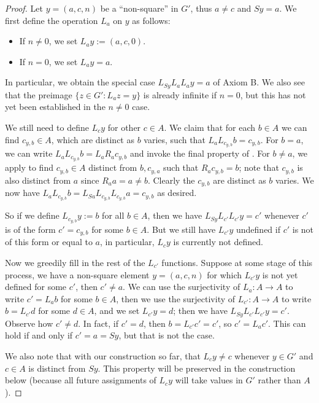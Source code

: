 \begin{proof}  Let $y = (a,c,n)$ be a ``non-square'' in $G'$, thus $a \neq c$ and $Sy = a$.  We first define the operation $L_a$ on $y$ as follows:
\begin{itemize}
  \item If $n \neq 0$, we set $L_a y := (a,c,0)$.
  \item If $n=0$, we set $L_a y = a$.
\end{itemize}
In particular, we obtain the special case $L_{Sy} L_a L_a y = a$ of Axiom B.  We also see that the preimage $\{ z \in G': L_a z = y \}$ is already infinite if $n = 0$, but this has not yet been established in the $n \neq 0$ case.

We still need to define $L_c y$ for other $c \in A$.  We claim that for each $b \in A$ we can find $c_{y,b} \in A$, which are distinct as $b$ varies, such that
$L_a L_{c_{y,b}} b = c_{y,b}$.  For $b=a$, we can write $L_a L_{c_{y,b}} b = L_a R_a c_{y,b}$ and invoke the final property of .  For $b \neq a$, we apply  to find $c_{y,b} \in A$ distinct from $b, c_{y,a}$ such that $R_a c_{y,b} = b$; note that $c_{y,b}$ is also distinct from $a$ since $R_a a = a \neq b$.  Clearly the $c_{y,b}$ are distinct as $b$ varies.  We now have $L_a L_{c_{y,b}} b = L_{Sa} L_{c_{y,b}} L_{c_{y,b}} a = c_{y,b}$ as desired.

So if we define $L_{c_{y,b}} y := b$ for all $b \in A$, then we have $L_{Sy} L_{c'} L_{c'} y = c'$ whenever $c'$ is of the form $c' = c_{y,b}$ for some $b \in A$.  But we still have $L_{c'} y$ undefined if $c'$ is not of this form or equal to $a$, in particular, $L_c y$ is currently not defined.

Now we greedily fill in the rest of the $L_{c'}$ functions.  Suppose at some stage of this process, we have a non-square element $y = (a,c,n)$ for which $L_{c'} y$ is not yet defined for some $c'$, then $c' \neq a$. We can use the surjectivity of $L_a: A \to A$ to write $c' = L_a b$ for some $b \in A$, then we use the surjectivity of $L_{c'}: A \to A$ to write $b = L_{c'} d$ for some $d \in A$, and we set $L_{c'} y = d$; then we have $L_{Sy} L_{c'} L_{c'} y = c'$.
Observe how $c' \neq d$. In fact, if $c' = d$, then $b = L_{c'} c' = c'$, so $c' = L_a c'$. This can hold if and only if $c' = a = S y$, but that is not the case.

We also note that with our construction so far, that $L_c y \neq c$ whenever $y \in G'$ and $c \in A$ is distinct from $Sy$.  This property will be preserved in the construction below (because all future assignments of $L_c y$ will take values in $G'$ rather than $A$).


\end{proof}
